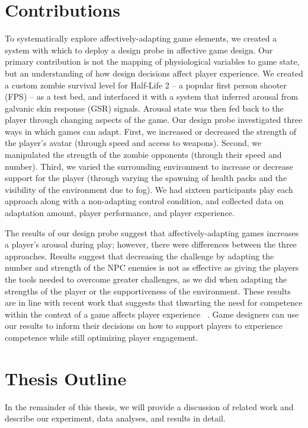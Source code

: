 \section{Contributions}
To systematically explore affectively-adapting game elements, we created a system with which to deploy a design probe in affective game design. Our primary contribution is not the mapping of physiological variables to game state, but an understanding of how design decisions affect player experience. We created a custom zombie survival level for Half-Life 2 – a popular first person shooter (FPS) – as a test bed, and interfaced it with a system that inferred arousal from galvanic skin response (GSR) signals. Arousal state was then fed back to the player through changing aspects of the game. Our design probe investigated three ways in which games can adapt. First, we increased or decreased the strength of the player's avatar (through speed and access to weapons). Second, we manipulated the strength of the zombie opponents (through their speed and number). Third, we varied the surrounding environment to increase or decrease support for the player (through varying the spawning of health packs and the visibility of the environment due to fog). We had sixteen participants play each approach along with a non-adapting control condition, and collected data on adaptation amount, player performance, and player experience.

The results of our design probe suggest that affectively-adapting games increases a player's arousal during play; however, there were differences between the three approaches. Results suggest that decreasing the challenge by adapting the number and strength of the NPC enemies is not as effective as giving the players the tools needed to overcome greater challenges, as we did when adapting the strengths of the player or the supportiveness of the environment. These results are in line with recent work that suggests that thwarting the need for competence within the context of a game affects player experience ~\cite{przybylski2013competence}. Game designers can use our results to inform their decisions on how to support players to experience competence while still optimizing player engagement.

\section{Thesis Outline}

In the remainder of this thesis, we will provide a discussion of related work and describe our experiment, data analyses, and results in detail.


